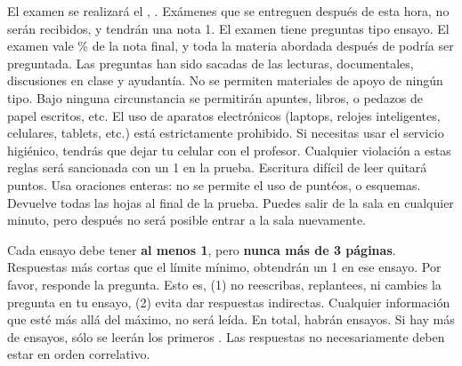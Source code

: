 \documentclass{article}
\begin{document}
El examen se realizar\'a el \underline{{\unskip}}, {\unskip}. Ex\'amenes que se entreguen despu\'es de esta hora, no ser\'an recibidos, y tendr\'an una nota 1. El examen tiene {\unskip} preguntas tipo ensayo. El examen vale {\unskip}\% de la nota final, y toda la materia abordada despu\'es de {\unskip} podr\'ia ser preguntada. Las preguntas han sido sacadas de las lecturas, documentales, discusiones en clase y ayudant\'ia. No se permiten materiales de apoyo de ning\'un tipo. Bajo ninguna circunstancia se permitir\'an apuntes, libros, o pedazos de papel escritos, etc. El uso de aparatos electr\'onicos (laptops, relojes inteligentes, celulares, tablets, etc.) est\'a estrictamente prohibido. Si necesitas usar el servicio higi\'enico, tendr\'as que dejar tu celular con el profesor. Cualquier violaci\'on a estas reglas ser\'a sancionada con un 1 en la prueba.  Escritura dif\'icil de leer quitar\'a puntos. Usa oraciones enteras: no se permite el uso de punt\'eos, o esquemas. Devuelve todas las hojas al final de la prueba. Puedes salir de la sala en cualquier minuto, pero despu\'es no ser\'a posible entrar a la sala nuevamente. 

Cada ensayo debe tener {\bf al menos 1}, pero {\bf nunca m\'as de 3 p\'aginas}. Respuestas m\'as cortas que el l\'imite m\'inimo, obtendr\'an un 1 en ese ensayo. Por favor, responde la pregunta. Esto es, (1) no reescribas, replantees, ni cambies la pregunta en tu ensayo, (2) evita dar respuestas indirectas. Cualquier informaci\'on que est\'e m\'as all\'a del m\'aximo, no ser\'a le\'ida. En total, habr\'an {\unskip} ensayos. Si hay m\'as de {\unskip} ensayos, s\'olo se leer\'an los primeros {\unskip}. Las respuestas no necesariamente deben estar en orden correlativo.
\end{document}
